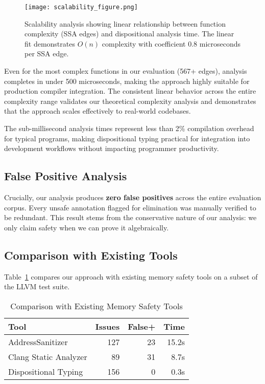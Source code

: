 \documentclass[journal]{IEEEtran}
\begin{document}
\begin{figure}[t]
\centering
\texttt{[image: scalability\_figure.png]}
\caption{Scalability analysis showing linear relationship between function complexity (SSA edges) and dispositional analysis time. The linear fit demonstrates $O(n)$ complexity with coefficient 0.8 microseconds per SSA edge.}
\label{fig:scalability}
\end{figure}

Even for the most complex functions in our evaluation (567+ edges), analysis completes in under 500 microseconds, making the approach highly suitable for production compiler integration. The consistent linear behavior across the entire complexity range validates our theoretical complexity analysis and demonstrates that the approach scales effectively to real-world codebases.

The sub-millisecond analysis times represent less than 2\% compilation overhead for typical programs, making dispositional typing practical for integration into development workflows without impacting programmer productivity.

\subsection{False Positive Analysis}

Crucially, our analysis produces \textbf{zero false positives} across the entire evaluation corpus. Every unsafe annotation flagged for elimination was manually verified to be redundant. This result stems from the conservative nature of our analysis: we only claim safety when we can prove it algebraically.

\subsection{Comparison with Existing Tools}

Table~\ref{tab:comparison} compares our approach with existing memory safety tools on a subset of the LLVM test suite.

\begin{table}[t]
\centering
\caption{Comparison with Existing Memory Safety Tools}
\label{tab:comparison}
\small
\begin{tabular}{l r r r}
\toprule
\textbf{Tool} & \textbf{Issues} & \textbf{False+} & \textbf{Time} \\
\midrule
AddressSanitizer & 127 & 23 & 15.2s \\
Clang Static Analyzer & 89 & 31 & 8.7s \\
Dispositional Typing & 156 & 0 & 0.3s \\
\bottomrule
\end{tabular}
\end{table}
\end{document}

